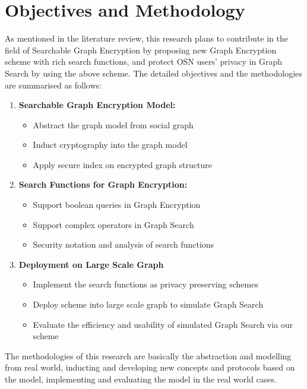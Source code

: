 \chapter{Objectives and Methodology}
As mentioned in the literature review, this research plans to contribute in the field of Searchable Graph Encryption by proposing new Graph Encryption scheme with rich search functions, and protect OSN users' privacy in Graph Search by using the above scheme. The detailed objectives and the methodologies are summarised as follows:
\begin{enumerate}
\setlength{\itemsep}{0pt}
\item {\bf Searchable Graph Encryption Model:}
\begin{itemize}
\setlength{\itemsep}{0pt}
\item Abstract the graph model from social graph
\item Induct cryptography into the graph model
\item Apply secure index on encrypted graph structure
\end{itemize}
\item{\bf Search Functions for Graph Encryption:}
\begin{itemize}
\setlength{\itemsep}{0pt}
\item Support boolean queries in Graph Encryption
\item Support complex operators in Graph Search
\item Security notation and analysis of search functions
\end{itemize}
\item{\bf Deployment on Large Scale Graph}
\begin{itemize}
\setlength{\itemsep}{0pt}
\item Implement the search functions as privacy preserving schemes
\item Deploy scheme into large scale graph to simulate Graph Search
\item Evaluate the efficiency and usability of simulated Graph Search via our scheme
\end{itemize}
\end{enumerate}

The methodologies of this research are basically the abstraction and modelling from real world, inducting and developing new concepts and protocols based on the model, implementing and evaluating the model in the real world cases.